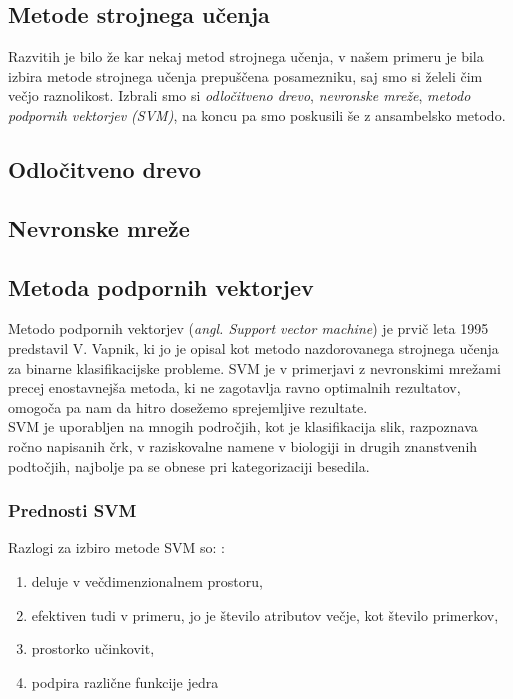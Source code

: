 \documentclass[a4paper,11pt]{article}
\begin{document}
\begin{multicols}{2}
\section{Metode strojnega učenja}
Razvitih je bilo že kar nekaj metod strojnega učenja, v našem primeru je bila izbira metode strojnega učenja prepuščena posamezniku, saj smo si želeli čim večjo raznolikost. Izbrali smo si \textit{odločitveno drevo}, \textit{nevronske mreže}, \textit{metodo podpornih vektorjev (SVM)}, na koncu pa smo poskusili še z ansambelsko metodo.

\subsection{Odločitveno drevo}


\subsection{Nevronske mreže}


\subsection{Metoda podpornih vektorjev}
Metodo podpornih  vektorjev (\textit{angl. Support vector machine}) je prvič leta 1995 predstavil V. Vapnik\cite{Vapnik}, ki jo je opisal kot metodo nazdorovanega strojnega učenja za binarne klasifikacijske probleme. SVM je v primerjavi z nevronskimi mrežami precej enostavnejša metoda, ki ne zagotavlja ravno optimalnih rezultatov, omogoča pa nam da hitro dosežemo sprejemljive rezultate\cite{Hsu}.\\
SVM je uporabljen na mnogih področjih, kot je klasifikacija slik, razpoznava ročno napisanih črk, v raziskovalne namene v biologiji in drugih znanstvenih podtočjih, najbolje pa se obnese pri kategorizaciji besedila\cite{Wiki_svm}.\\
\subsubsection{Prednosti SVM}
Razlogi za izbiro metode SVM so: \cite{SciDev}:
\begin{enumerate}
\item{deluje v večdimenzionalnem prostoru,}
\item{efektiven tudi v primeru, jo je število atributov večje, kot število primerkov,}
\item{prostorko učinkovit,}
\item{podpira različne funkcije jedra}
\end{enumerate}


\end{multicols}
\end{document}
